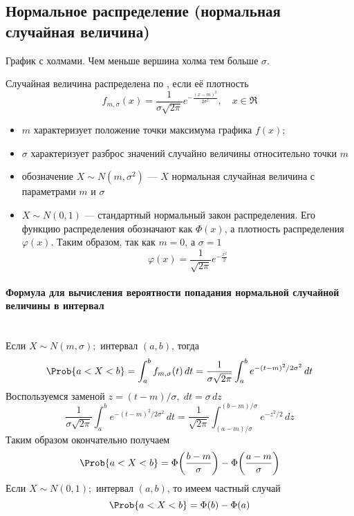 \subsection{Нормальное распределение (нормальная случайная величина)}

График с холмами. Чем меньше вершина холма тем больше $\sigma$.

\begin{definition}
	Случайная величина распределена по , если её плотность
	\[
		f_{m, \sigma}(x) = \frac{1}{\sigma \sqrt{2\pi}} e^{-\frac{(x-m)^2}{2\sigma^2}}, \quad x \in \Re
	\]
	\begin{itemize}
		\item $m$ характеризует положение точки максимума графика $f(x)$;
		\item $\sigma$ характеризует разброс значений случайно величины относительно точки $m$
		\item обозначение $X \sim N(m, \sigma^2)$ --- $X$ нормальная случайная величина с параметрами $m$ и $\sigma$
		\item $X \sim N(0, 1)$ --- стандартный нормальный закон распределения. Его функцию распределения обозначают как $\Phi(x)$, а плотность распределения $\varphi(x)$. Таким образом, так как $m = 0$, а $\sigma = 1$
		\[
			\varphi(x) = \frac{1}{\sqrt{2\pi}} e^{-\frac{x^2}{2}}
		\]
	\end{itemize}
\end{definition}

\paragraph{Формула для вычисления вероятности попадания нормальной случайной величины в интервал}\hfill\\

\noindent
Если $X \sim N(m, \sigma);$ интервал $(a, b)$, тогда
\[
	\Prob\{a < X < b\} = \int_{a}^{b} f_{m, \sigma}(t)\,dt = \frac{1}{\sigma \sqrt{2\pi}} \int_{a}^{b} e^{-(t-m)^2/2\sigma^2}\,dt
\]
Воспользуемся заменой $z = (t - m)/\sigma,\; dt = \sigma\,dz$
\[
	\frac{1}{\sigma \sqrt{2\pi}} \int_{a}^{b} e^{-(t-m)^2/2\sigma^2}\,dt = \frac{1}{\sqrt{2\pi}} \int_{(a - m)/\sigma}^{(b - m)/\sigma} e^{-z^2/2}\,dz
\]
Таким образом окончательно получаем
\[
	\Prob\{a < X < b\} = \Phi\biggl(\frac{b - m}{\sigma}\biggr) - \Phi\biggl(\frac{a-m}{\sigma}\biggr)
\]
Если $X \sim N(0, 1);$ интервал $(a, b)$, то имеем частный случай
\[
	\Prob\{a < X < b\} = \Phi(b) - \Phi(a)
\]



